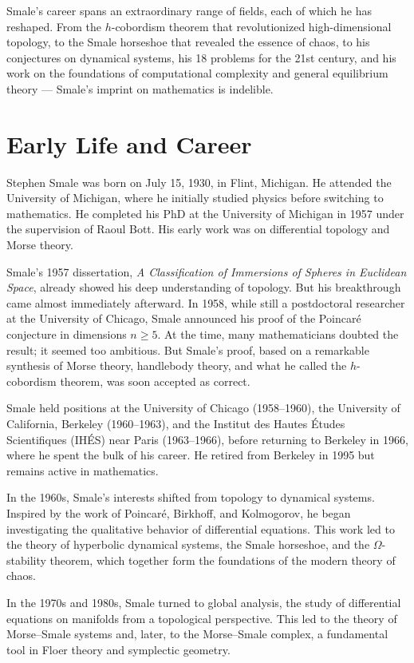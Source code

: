 Smale's career spans an extraordinary range of fields, each of which he has reshaped. From the \(h\)-cobordism theorem that revolutionized high-dimensional topology, to the Smale horseshoe that revealed the essence of chaos, to his conjectures on dynamical systems, his 18 problems for the 21st century, and his work on the foundations of computational complexity and general equilibrium theory --- Smale's imprint on mathematics is indelible.

\section{Early Life and Career}

Stephen Smale was born on July 15, 1930, in Flint, Michigan. He attended the University of Michigan, where he initially studied physics before switching to mathematics. He completed his PhD at the University of Michigan in 1957 under the supervision of Raoul Bott. His early work was on differential topology and Morse theory.

Smale's 1957 dissertation, \textit{A Classification of Immersions of Spheres in Euclidean Space}, already showed his deep understanding of topology. But his breakthrough came almost immediately afterward. In 1958, while still a postdoctoral researcher at the University of Chicago, Smale announced his proof of the Poincar\'e conjecture in dimensions \(n \geq 5\). At the time, many mathematicians doubted the result; it seemed too ambitious. But Smale's proof, based on a remarkable synthesis of Morse theory, handlebody theory, and what he called the \(h\)-cobordism theorem, was soon accepted as correct.

Smale held positions at the University of Chicago (1958--1960), the University of California, Berkeley (1960--1963), and the Institut des Hautes \'Etudes Scientifiques (IH\'ES) near Paris (1963--1966), before returning to Berkeley in 1966, where he spent the bulk of his career. He retired from Berkeley in 1995 but remains active in mathematics.

In the 1960s, Smale's interests shifted from topology to dynamical systems. Inspired by the work of Poincar\'e, Birkhoff, and Kolmogorov, he began investigating the qualitative behavior of differential equations. This work led to the theory of hyperbolic dynamical systems, the Smale horseshoe, and the \(\Omega\)-stability theorem, which together form the foundations of the modern theory of chaos.

In the 1970s and 1980s, Smale turned to global analysis, the study of differential equations on manifolds from a topological perspective. This led to the theory of Morse--Smale systems and, later, to the Morse--Smale complex, a fundamental tool in Floer theory and symplectic geometry.

